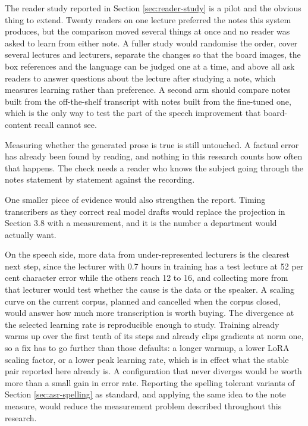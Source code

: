 The reader study reported in Section \ref{sec:reader-study} is a pilot and the obvious
thing to extend. Twenty readers on one lecture preferred the notes this system produces,
but the comparison moved several things at once and no reader was asked to learn from
either note. A fuller study would randomise the order, cover several lectures and
lecturers, separate the changes so that the board images, the box references and the
language can be judged one at a time, and above all ask readers to answer questions about
the lecture after studying a note, which measures learning rather than preference. A
second arm should compare notes built from the off-the-shelf transcript with notes built
from the fine-tuned one, which is the only way to test the part of the speech improvement
that board-content recall cannot see.

Measuring whether the generated prose is true is still untouched. A factual error has
already been found by reading, and nothing in this research counts how often that happens.
The check needs a reader who knows the subject going through the notes statement by
statement against the recording.

One smaller piece of evidence would also strengthen the report.
Timing transcribers as they correct real model drafts would replace the projection in
Section 3.8 with a measurement, and it is the number a department would actually want.

On the speech side, more data from under-represented lecturers is the clearest next step,
since the lecturer with 0.7 hours in training has a test lecture at 52 per cent character
error while the others reach 12 to 16, and collecting more from that lecturer would test
whether the cause is the data or the speaker. A scaling curve on the current corpus,
planned and cancelled when the corpus closed, would answer how much more transcription is
worth buying. The divergence at the selected learning rate is reproducible enough to
study. Training already warms up over the first tenth of its steps and already clips
gradients at norm one, so a fix has to go further than those defaults: a longer warmup, a
lower LoRA scaling factor, or a lower peak learning rate, which is in effect what the
stable pair reported here already is. A configuration that never diverges would be worth
more than a small gain in error rate. Reporting the spelling tolerant variants of Section \ref{sec:asr-spelling} as
standard, and applying the same idea to the note measure, would reduce the measurement
problem described throughout this research.

